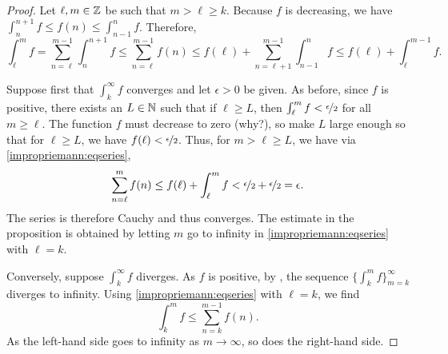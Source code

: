 \begin{proof}
Let $\ell, m \in {\mathbb{Z}}$ be such that $m > \ell \geq k$.
Because $f$ is decreasing, we have
$\int_{n}^{n+1} f \leq f(n) \leq \int_{n-1}^{n} f$.  Therefore,
\begin{equation} \label{impropriemann:eqseries}
\int_\ell^m f
=
\sum_{n=\ell}^{m-1} \int_{n}^{n+1} f
\leq
\sum_{n=\ell}^{m-1} f(n)
\leq
f(\ell) +
\sum_{n=\ell+1}^{m-1} \int_{n-1}^{n} f
\leq
f(\ell)+
\int_\ell^{m-1} f .
\end{equation}

Suppose first that $\int_k^\infty f$ converges and
let $\epsilon > 0$ be given.
As before, since $f$ is positive, there exists
an $L \in {\mathbb{N}}$ such that if $\ell \geq L$, then
$\int_\ell^{m} f < \nicefrac{\epsilon}{2}$ for all $m \geq \ell$.
The function 
$f$ must decrease to zero (why?), so make $L$ large enough so that
for $\ell \geq L$, we have $f(\ell) < \nicefrac{\epsilon}{2}$.
Thus, for $m > \ell \geq L$, we have
via \eqref{impropriemann:eqseries},
\begin{equation*}
\sum_{n=\ell}^{m} f(n)
\leq
f(\ell)+
\int_\ell^{m} f < \nicefrac{\epsilon}{2} + \nicefrac{\epsilon}{2} = \epsilon .
\end{equation*}
The series is therefore Cauchy and thus converges.  The estimate in the
proposition is obtained by letting $m$ go to infinity in
\eqref{impropriemann:eqseries} with $\ell = k$.

Conversely, suppose $\int_k^\infty f$ diverges.  
As $f$ is positive, by ,
the sequence $\{ \int_k^m f \}_{m=k}^\infty$ diverges to infinity.
Using
\eqref{impropriemann:eqseries} with $\ell = k$, we find
\begin{equation*}
\int_k^m f
\leq
\sum_{n=k}^{m-1} f(n) .
\end{equation*}
As the left-hand side goes to infinity as $m \to \infty$, so does the
right-hand side.
\end{proof}

